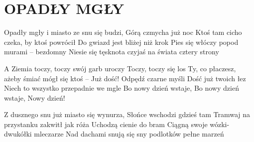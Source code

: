 \documentclass[../../../songbook.tex]{subfiles}
\begin{document}
\TabPositions{8cm} %
\section*{OPADŁY MGŁY}
{}
\vspace{0.5cm}
Opadły mgły i miasto ze snu się budzi,		 \newline
Górą czmycha już noc 						 \newline
Ktoś tam cicho czeka, by ktoś powrócił				 \newline
Do gwiazd jest bliżej niż krok				 \newline
Pies się włóczy popod murami – bezdomny				 \newline
Niesie się tęsknota czyjaś na świata cztery strony				 \newline

\-\hspace{1cm} A Ziemia toczy, toczy swój garb uroczy				 \newline
\-\hspace{1cm} Toczy, toczy się los				 \newline
\-\hspace{1cm} Ty, co płaczesz, ażeby śmiać mógł się ktoś				 \newline
\-\hspace{1cm} – Już dość!				 \newline
\-\hspace{1cm} Odpędź czarne myśli				 \newline
\-\hspace{1cm} Dość już twoich łez				 \newline
\-\hspace{1cm} Niech to wszystko przepadnie we mgle				 \newline
\-\hspace{1cm} Bo nowy dzień wstaje,				 \newline
\-\hspace{1cm} Bo nowy dzień wstaje,				 \newline
\-\hspace{1cm} Nowy dzień!				 \newline

Z dusznego snu już miasto się wynurza,				 \newline
Słońce wschodzi gdzieś tam				 \newline
Tramwaj na przystanku zakwitł jak róża				 \newline
Uchodzą cienie do bram				 \newline
Ciągną swoje wózki-dwukółki mleczarze				 \newline
Nad dachami snują się sny podlotków pełne marzeń				 \newline
\end{document}
